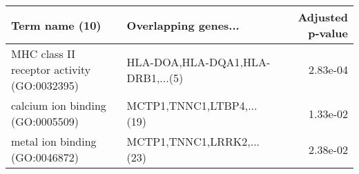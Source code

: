 \begin{tabular}{llr}
\toprule
                             Term name (10) &             Overlapping genes... &  Adjusted p-value \\
\midrule
MHC class II receptor activity (GO:0032395) & HLA-DOA,HLA-DQA1,HLA-DRB1,...(5) &          2.83e-04 \\
           calcium ion binding (GO:0005509) &        MCTP1,TNNC1,LTBP4,...(19) &          1.33e-02 \\
             metal ion binding (GO:0046872) &        MCTP1,TNNC1,LRRK2,...(23) &          2.38e-02 \\
\bottomrule
\end{tabular}
